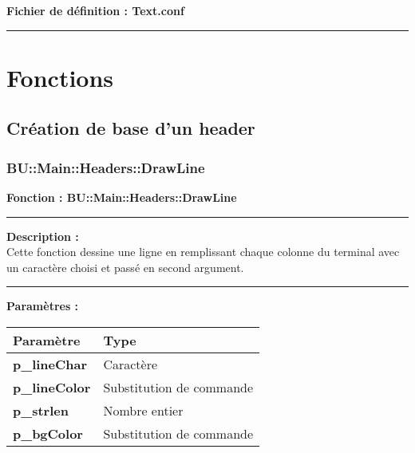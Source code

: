 \documentclass[a4paper,10pt]{article}
\begin{document}
\textbf{Fichier de définition : \color{lime}Text.conf}\\[1\baselineskip]





\color{red}\par\noindent\rule{\textwidth}{0.4pt}\color{white}

\color{red}
\section{Fonctions}\color{white}

\color{green}
\subsection{Création de base d'un header}\color{white}

\color{blue}
\subsubsection{BU::Main::Headers::DrawLine}\color{white}

\textbf{Fonction : \color{mauve}BU::Main::Headers::DrawLine}\\

\par\noindent\rule{\textwidth}{0.4pt}

\begin{justify}
    \textbf{Description :}\\
    Cette fonction dessine une ligne en remplissant chaque colonne du terminal avec un caractère choisi et passé en second argument.
\end{justify}

\par\noindent\rule{\textwidth}{0.4pt}

\textbf{Paramètres :}\\[1\baselineskip]
\begin{tabular}{|l|l|}
\hline
\textbf{Paramètre} & \textbf{Type} \\
\hline
\textbf{\color{orange}p\_lineChar} & Caractère\\
\hline
\textbf{\color{orange}p\_lineColor} & Substitution de commande\\
\hline
\textbf{\color{orange}p\_strlen} & Nombre entier\\
\hline
\textbf{\color{orange}p\_bgColor} & Substitution de commande\\
\hline
\end{tabular}\\[1\baselineskip]
\end{document}
